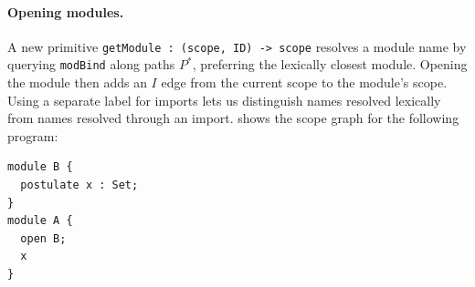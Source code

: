 \paragraph{Opening modules.} A new primitive
\texttt{getModule : (scope, ID) -> scope} resolves a module name by querying
\texttt{modBind} along paths $P^*$, preferring the lexically closest module.
Opening the module then adds an $I$ edge from the current scope to the module's
scope. Using a separate label for imports lets us distinguish names resolved
lexically from names resolved through an import. 
shows the scope graph for the following program:
\begin{lstlisting}[caption={Opening a module}, label=lst:moduleresolution]
module B {
  postulate x : Set;
}
module A {
  open B;
  x
}
\end{lstlisting}

